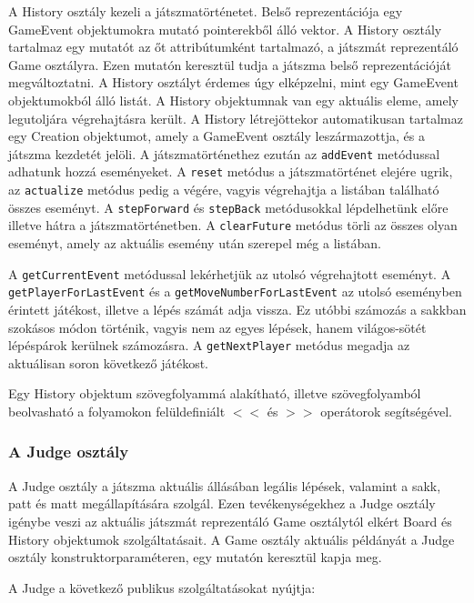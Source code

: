 \documentclass[12pt, twoside]{report}
\begin{document}
A History osztály kezeli a játszmatörténetet. Belső reprezentációja egy GameEvent objektumokra mutató pointerekből álló vektor. A History osztály tartalmaz egy mutatót az őt attribútumként tartalmazó, a játszmát reprezentáló Game osztályra. Ezen mutatón keresztül tudja a játszma belső reprezentációját megváltoztatni. A History osztályt érdemes úgy elképzelni, mint egy GameEvent objektumokból álló listát. A History objektumnak van egy aktuális eleme, amely legutoljára végrehajtásra került. A History létrejöttekor automatikusan tartalmaz egy Creation objektumot, amely a GameEvent osztály leszármazottja, és a játszma kezdetét jelöli. A játszmatörténethez ezután az {\tt addEvent} metódussal adhatunk hozzá eseményeket. A {\tt reset} metódus a játszmatörténet elejére ugrik, az {\tt actualize} metódus pedig a végére, vagyis végrehajtja a listában található összes eseményt. A {\tt stepForward} és {\tt stepBack} metódusokkal lépdelhetünk előre illetve hátra a játszmatörténetben. A {\tt clearFuture} metódus törli az összes olyan eseményt, amely az aktuális esemény után szerepel még a listában.

A {\tt getCurrentEvent} metódussal lekérhetjük az utolsó végrehajtott eseményt. A {\tt getPlayerForLastEvent} és a {\tt getMoveNumberForLastEvent} az utolsó eseményben érintett játékost, illetve a lépés számát adja vissza. Ez utóbbi számozás a sakkban szokásos módon történik, vagyis nem az egyes lépések, hanem világos-sötét lépéspárok kerülnek számozásra. A {\tt getNextPlayer} metódus megadja az aktuálisan soron következő játékost.

Egy History objektum szövegfolyammá alakítható, illetve szövegfolyamból beolvasható a folyamokon felüldefiniált $<<$ és $>>$ operátorok segítségével.

\subsubsection{A Judge osztály}

A Judge osztály a játszma aktuális állásában legális lépések, valamint a sakk, patt és matt megállapítására szolgál. Ezen tevékenységekhez a Judge osztály igénybe veszi az aktuális játszmát reprezentáló Game osztálytól elkért Board és History objektumok szolgáltatásait. A Game osztály aktuális példányát a Judge osztály konstruktorparaméteren, egy mutatón keresztül kapja meg.

A Judge a következő publikus szolgáltatásokat nyújtja:
\end{document}
